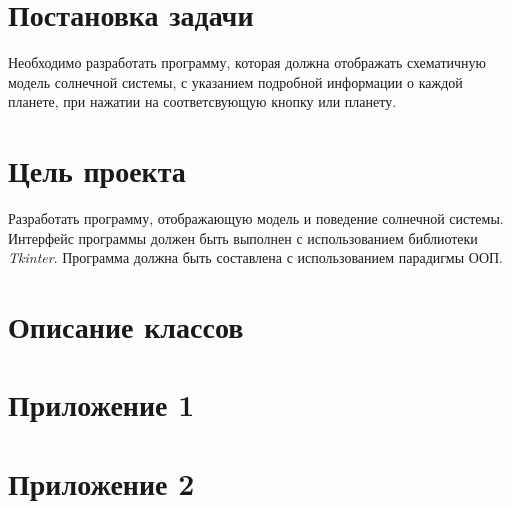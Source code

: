 \documentclass[11pt,a4paper]{report}
\begin{document}
\section{Постановка задачи}
Необходимо разработать программу, которая  должна отображать схематичную модель солнечной системы, с указанием подробной информации о каждой  планете, при нажатии на соответсвующую кнопку или планету. 

\section{Цель проекта}
Разработать программу, отображающую модель и поведение солнечной системы. Интерфейс программы должен быть выполнен с использованием библиотеки \textit{Tkinter}. Программа должна быть составлена с использованием парадигмы ООП.

\section{Описание классов}





\section{Приложение 1}

\section{Приложение 2}
\end{document}
